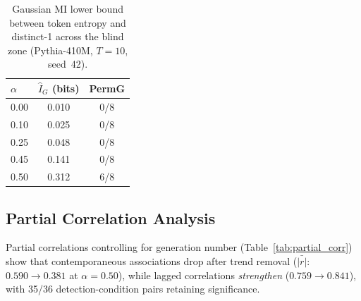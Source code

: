 \begin{table}[t]
\centering
\small
\caption{Gaussian MI lower bound between token entropy and distinct-1 across the blind zone (Pythia-410M, $T{=}10$, seed~42).}
\label{tab:mi_blind}
\begin{tabular}{lcc}
\toprule
$\alpha$ & $\hat{I}_G$ (bits) & PermG \\
\midrule
0.00 & 0.010 & 0/8 \\
0.10 & 0.025 & 0/8 \\
0.25 & 0.048 & 0/8 \\
0.45 & 0.141 & 0/8 \\
0.50 & 0.312 & 6/8 \\
\bottomrule
\end{tabular}
\end{table}

\subsection{Partial Correlation Analysis}
\label{app:partial_corr}

Partial correlations controlling for generation number (Table~\ref{tab:partial_corr}) show that contemporaneous associations drop after trend removal ($\bar{|r|}$: $0.590{\to}0.381$ at $\alpha{=}0.50$), while lagged correlations \emph{strengthen} ($0.759{\to}0.841$), with 35/36 detection-condition pairs retaining significance.

\begin{table}[t]
\centering
\small
\caption{Partial correlation controlling for generation. Lagged partial $|r|$ increases after trend removal, confirming genuine temporal precedence.}
\label{tab:partial_corr}
\end{table}

